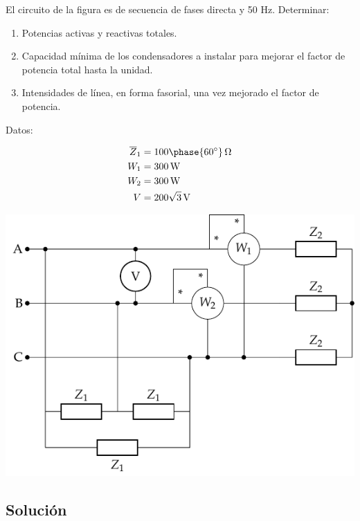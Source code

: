 El circuito de la figura es de secuencia de fases directa y 50 Hz. Determinar:
\begin{enumerate}
\item Potencias activas y reactivas totales.
\item Capacidad mínima de los condensadores a instalar para mejorar el factor de potencia total hasta la unidad.
\item Intensidades de línea, en forma fasorial, una vez mejorado el factor de potencia.
\end{enumerate}
\begin{minipage}{0.4\linewidth}

  \vspace{-30mm}
  Datos: 

  \begin{align*}
    \overline{Z}_1 &= {100\phase{\ang{60}}}\,\unit{\ohm}\\
      W_1 &= \SI{300}{\watt}\\
      W_2 &= \SI{300}{\watt}\\
      V &= {200\sqrt{3}}\,\unit{\volt}
  \end{align*}
\end{minipage}
\begin{minipage}{0.6\linewidth}
  \begin{center}
    \includegraphics{figuras/ZyZt}
  \end{center}
\end{minipage}

\subsection*{Solución}

